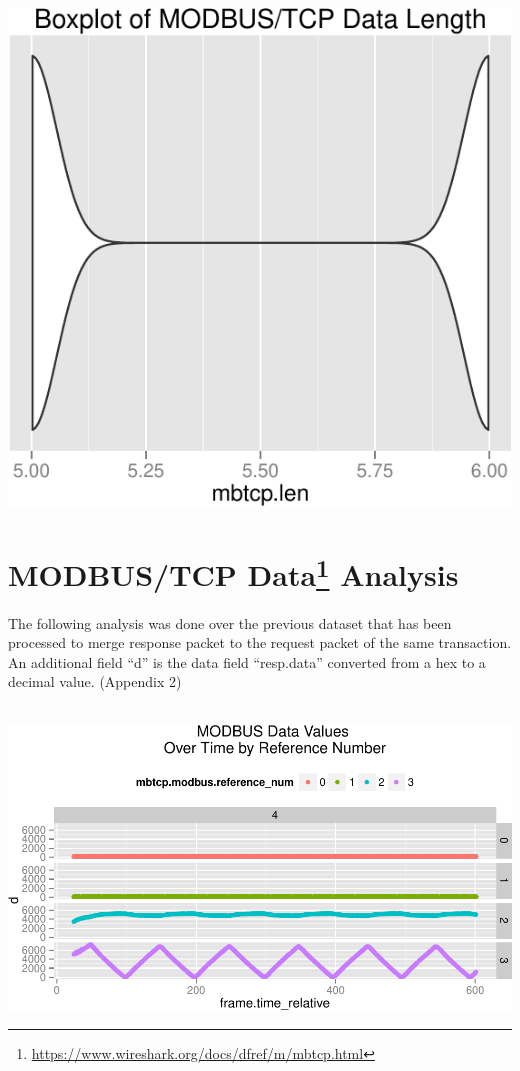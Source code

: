 \documentclass[]{article}
\let\rmarkdownfootnote\footnote%
\def\footnote{\protect\rmarkdownfootnote}
\begin{document}
\begin{center}\includegraphics{modbus_files/figure-latex/unnamed-chunk-18-1} \end{center}

\pagebreak

\section[MODBUS/TCP Data Analysis]{MODBUS/TCP Data\footnote{\url{https://www.wireshark.org/docs/dfref/m/mbtcp.html}}
Analysis}\label{modbustcp-data1-analysis}

The following analysis was done over the previous dataset that has been
processed to merge response packet to the request packet of the same
transaction. An additional field ``d'' is the data field ``resp.data''
converted from a hex to a decimal value. (Appendix 2)
~\\\hspace*{0.333em}\\\hspace*{0.333em}

\includegraphics{modbus_files/figure-latex/unnamed-chunk-19-1.pdf}
\end{document}

